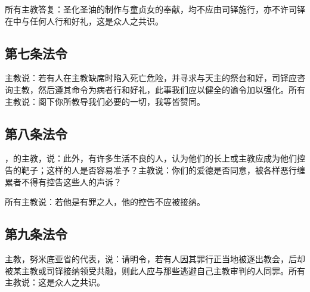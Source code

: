 所有主教答复：圣化圣油的制作与童贞女的奉献，均不应由司铎施行，亦不许司铎在中与任何人行和好礼，这是众人之共识。\par


\subsection{第七条法令}

\par

主教说：若有人在主教缺席时陷入死亡危险，并寻求与天主的祭台和好，司铎应咨询主教，然后遵其命令为病者行和好礼，此事我们应以健全的谕令加以强化。所有主教说：阁下你所教导我们必要的一切，我等皆赞同。\par


\subsection{第八条法令}

\par

，的主教，说：此外，有许多生活不良的人，认为他们的长上或主教应成为他们控告的靶子；这样的人是否容易准予？主教说：你们的爱德是否同意，被各样恶行缠累者不得有控告这些人的声诉？\par

所有主教说：若他是有罪之人，他的控告不应被接纳。\par


\subsection{第九条法令}

\par

主教，努米底亚省的代表，说：请明令，若有人因其罪行正当地被逐出教会，后却被某主教或司铎接纳领受共融，则此人应与那些逃避自己主教审判的人同罪。所有主教说：这是众人之共识。\par

